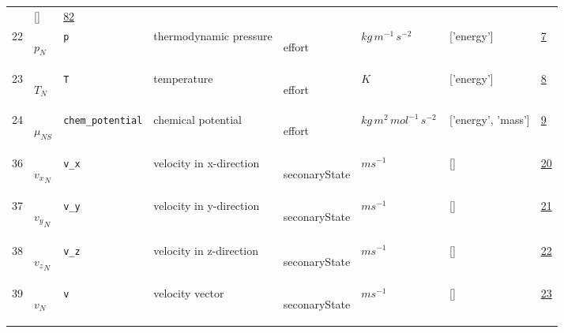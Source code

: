 \begin{longtable}{|p{1cm}|p{3cm}|p{3cm}|p{7cm}|p{3.0cm}|p{3cm}|p{2cm}|p{1cm}|}
             & []
             & \hyperlink{"e:82"}{ 82 }
                 \\
    22
             & \hypertarget{"v:22"}{ $ {p}_{N} $}
             & \verb|p|
             & thermodynamic pressure
             & \begin{lay}effort \end{lay}
             & $ kg \,m^{-1} \,s^{-2} \, $
             & ['energy']
             & \hyperlink{"e:7"}{ 7 }
                 \\
    23
             & \hypertarget{"v:23"}{ $ {T}_{N} $}
             & \verb|T|
             & temperature
             & \begin{lay}effort \end{lay}
             & $ K \, $
             & ['energy']
             & \hyperlink{"e:8"}{ 8 }
                 \\
    24
             & \hypertarget{"v:24"}{ $ {\mu}_{{N S}} $}
             & \verb|chem_potential|
             & chemical potential
             & \begin{lay}effort \end{lay}
             & $ kg \,m^{2} \,mol^{-1} \,s^{-2} \, $
             & ['energy', 'mass']
             & \hyperlink{"e:9"}{ 9 }
                 \\
    36
             & \hypertarget{"v:36"}{ $ {v_x}_{N} $}
             & \verb|v_x|
             & velocity in x-direction
             & \begin{lay}seconaryState \end{lay}
             & $ m s^{-1} \, $
             & []
             & \hyperlink{"e:20"}{ 20 }
                 \\
    37
             & \hypertarget{"v:37"}{ $ {v_y}_{N} $}
             & \verb|v_y|
             & velocity in y-direction
             & \begin{lay}seconaryState \end{lay}
             & $ m s^{-1} \, $
             & []
             & \hyperlink{"e:21"}{ 21 }
                 \\
    38
             & \hypertarget{"v:38"}{ $ {v_z}_{N} $}
             & \verb|v_z|
             & velocity in z-direction
             & \begin{lay}seconaryState \end{lay}
             & $ m s^{-1} \, $
             & []
             & \hyperlink{"e:22"}{ 22 }
                 \\
    39
             & \hypertarget{"v:39"}{ $ {v}_{N} $}
             & \verb|v|
             & velocity vector
             & \begin{lay}seconaryState \end{lay}
             & $ m s^{-1} \, $
             & []
             & \hyperlink{"e:23"}{ 23 }
                 \\
    \end{longtable}